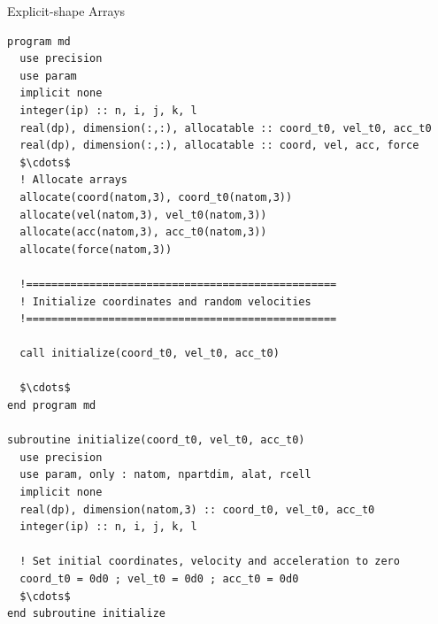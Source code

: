 \documentclass[10pt,t]{beamer}
\begin{document}
\begin{frame}[fragile]{Explicit-shape Arrays}
  \begin{lstlisting}[language={[90]Fortran},basicstyle=\fontsize{4.5}{5.5}\selectfont\ttfamily,mathescape]
program md
  use precision
  use param
  implicit none
  integer(ip) :: n, i, j, k, l
  real(dp), dimension(:,:), allocatable :: coord_t0, vel_t0, acc_t0
  real(dp), dimension(:,:), allocatable :: coord, vel, acc, force
  $\cdots$
  ! Allocate arrays
  allocate(coord(natom,3), coord_t0(natom,3))
  allocate(vel(natom,3), vel_t0(natom,3))
  allocate(acc(natom,3), acc_t0(natom,3))
  allocate(force(natom,3))

  !=================================================
  ! Initialize coordinates and random velocities
  !=================================================

  call initialize(coord_t0, vel_t0, acc_t0)

  $\cdots$
end program md

subroutine initialize(coord_t0, vel_t0, acc_t0)
  use precision
  use param, only : natom, npartdim, alat, rcell
  implicit none
  real(dp), dimension(natom,3) :: coord_t0, vel_t0, acc_t0
  integer(ip) :: n, i, j, k, l

  ! Set initial coordinates, velocity and acceleration to zero
  coord_t0 = 0d0 ; vel_t0 = 0d0 ; acc_t0 = 0d0
  $\cdots$
end subroutine initialize
  \end{lstlisting}
\end{frame}
\end{document}
